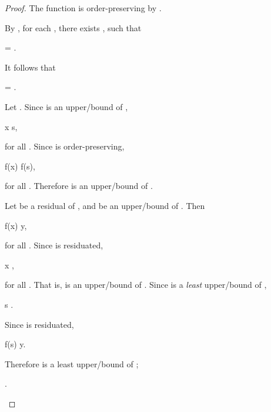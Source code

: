 \documentclass[b5paper, english, oneside]{memoir}
\begin{document}
\begin{proof}
The function  is order-preserving by .

By , for each , there exists , such that
\begin{eqs}
 = .
\end{eqs}
It follows that
\begin{eqs}
 =  \neq \emptyset.
\end{eqs}

Let . Since  is an upper\-/bound of ,
\begin{eqs}
x \preleq s,
\end{eqs}
for all . Since  is order-preserving,
\begin{eqs}
f(x) \preleqb f(s),
\end{eqs}
for all . Therefore  is an upper\-/bound of .

Let  be a residual of , and  be an upper\-/bound of . Then
\begin{eqs}
f(x) \preleqb y,
\end{eqs}
for all . Since  is residuated,
\begin{eqs}
x \preleq {},
\end{eqs}
for all . That is,  is an upper\-/bound of . Since  is a \emph{least} upper\-/bound of ,
\begin{eqs}
s \preleq {}.
\end{eqs}
Since  is residuated,
\begin{eqs}
f(s) \preleqb y.
\end{eqs}
Therefore  is a least upper\-/bound of ;
\begin{eqs}
 \subset {}.
\end{eqs}


\end{proof}
\end{document}

